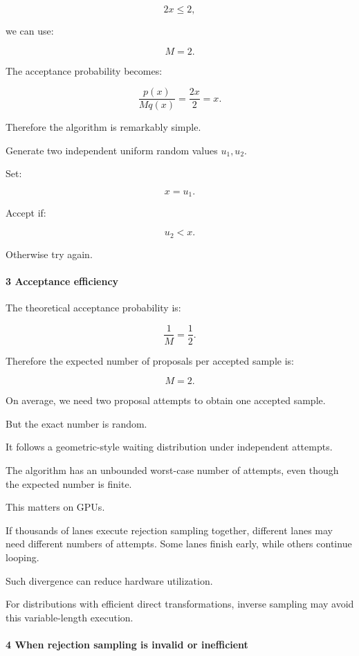 \[
 2x\le2,
\]

we can use:

\[
 M=2.
\]

The acceptance probability becomes:

\[
 \frac{p(x)}{Mq(x)} = \frac{2x}{2} =x.
\]

Therefore the algorithm is remarkably simple.

Generate two independent uniform random values \(u_1,u_2\).

Set:

\[
 x=u_1.
\]

Accept if:

\[
 \boxed{u_2<x}.
\]

Otherwise try again.

\paragraph{3 Acceptance efficiency}\label{02-foundations-ii-ch029-acceptance-efficiency}

\hypertarget{02-foundations-ii-ch029-acceptance-efficiency}{}

The theoretical acceptance probability is:

\[
 \frac1M=\frac12.
\]

Therefore the expected number of proposals per accepted sample is:

\[
 \boxed{M=2}.
\]

On average, we need two proposal attempts to obtain one accepted sample.

But the exact number is random.

It follows a geometric-style waiting distribution under independent attempts.

The algorithm has an unbounded worst-case number of attempts, even though the expected number is finite.

This matters on GPUs.

If thousands of lanes execute rejection sampling together, different lanes may need different numbers of attempts. Some lanes finish early, while others continue looping.

Such divergence can reduce hardware utilization.

For distributions with efficient direct transformations, inverse sampling may avoid this variable-length execution.

\paragraph{4 When rejection sampling is invalid or inefficient}\label{02-foundations-ii-ch029-when-rejection-sampling-is-invalid-or-inefficient}

